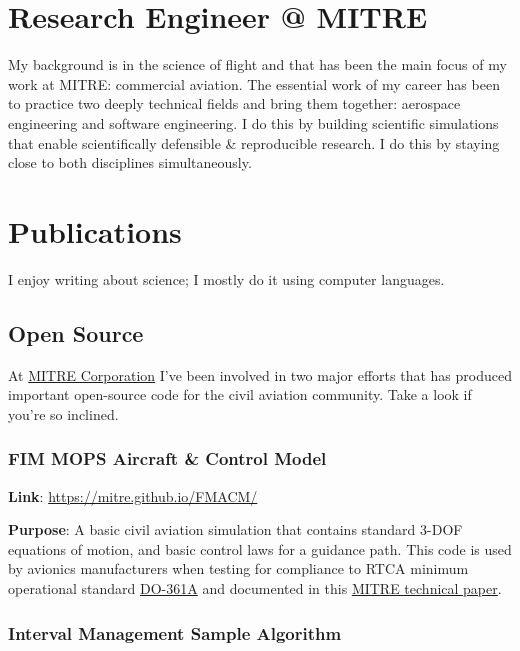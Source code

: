 \documentclass[
  letterpaper,
  DIV=11,
  numbers=noendperiod]{scrartcl}
\begin{document}
\section{Research Engineer @ MITRE}\label{research-engineer-mitre}

My background is in the science of flight and that has been the main
focus of my work at MITRE: commercial aviation. The essential work of my
career has been to practice two deeply technical fields and bring them
together: aerospace engineering and software engineering. I do this by
building scientific simulations that enable scientifically defensible \&
reproducible research. I do this by staying close to both disciplines
simultaneously.

\section{Publications}\label{publications}

I enjoy writing about science; I mostly do it using computer languages.

\subsection{Open Source}\label{open-source}

At \href{https://www.mitre.org}{MITRE Corporation} I've been involved in
two major efforts that has produced important open-source code for the
civil aviation community. Take a look if you're so inclined.

\subsubsection{FIM MOPS Aircraft \& Control
Model}\label{fim-mops-aircraft-control-model}

\textbf{Link}: \url{https://mitre.github.io/FMACM/}

\textbf{Purpose}: A basic civil aviation simulation that contains
standard 3-DOF equations of motion, and basic control laws for a
guidance path. This code is used by avionics manufacturers when testing
for compliance to RTCA minimum operational standard
\href{https://my.rtca.org/NC__Product?id=a1B1R00000BdQlmUAF}{DO-361A}
and documented in this
\href{https://www.mitre.org/publications/technical-papers/derivation-of-a-point-mass-aircraft-model-used-for-fast-time}{MITRE
technical paper}.

\subsubsection{Interval Management Sample
Algorithm}\label{interval-management-sample-algorithm}
\end{document}
